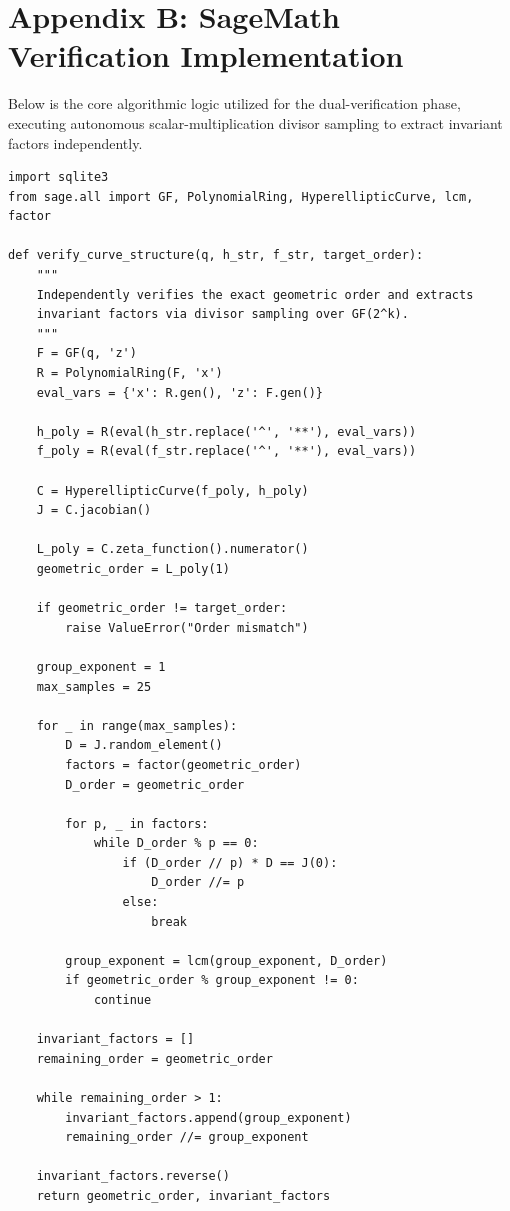 \documentclass[12pt]{article}
\begin{document}
\section*{Appendix B: SageMath Verification Implementation}
Below is the core algorithmic logic utilized for the dual-verification phase, executing autonomous scalar-multiplication divisor sampling to extract invariant factors independently.

\begin{verbatim}
import sqlite3
from sage.all import GF, PolynomialRing, HyperellipticCurve, lcm, factor

def verify_curve_structure(q, h_str, f_str, target_order):
    """
    Independently verifies the exact geometric order and extracts 
    invariant factors via divisor sampling over GF(2^k).
    """
    F = GF(q, 'z')
    R = PolynomialRing(F, 'x')
    eval_vars = {'x': R.gen(), 'z': F.gen()} 
    
    h_poly = R(eval(h_str.replace('^', '**'), eval_vars))
    f_poly = R(eval(f_str.replace('^', '**'), eval_vars))
    
    C = HyperellipticCurve(f_poly, h_poly)
    J = C.jacobian()
    
    L_poly = C.zeta_function().numerator()
    geometric_order = L_poly(1)
    
    if geometric_order != target_order:
        raise ValueError("Order mismatch")
        
    group_exponent = 1
    max_samples = 25  
    
    for _ in range(max_samples):
        D = J.random_element()
        factors = factor(geometric_order)
        D_order = geometric_order
        
        for p, _ in factors:
            while D_order % p == 0:
                if (D_order // p) * D == J(0):
                    D_order //= p
                else:
                    break
                    
        group_exponent = lcm(group_exponent, D_order)
        if geometric_order % group_exponent != 0:
            continue 

    invariant_factors = []
    remaining_order = geometric_order
    
    while remaining_order > 1:
        invariant_factors.append(group_exponent)
        remaining_order //= group_exponent
        
    invariant_factors.reverse() 
    return geometric_order, invariant_factors
\end{verbatim}
\end{document}
